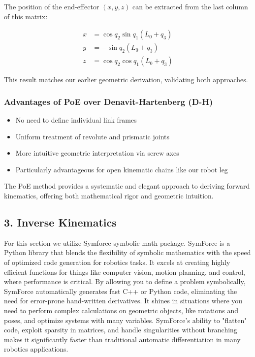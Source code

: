\begin{solution}
The position of the end-effector $(x, y, z)$ can be extracted from the last column of this matrix:

\begin{align*}
    x &= \cos q_2 \sin q_1 (L_0 + q_3) \\
    y &= -\sin q_2 (L_0 + q_3) \\
    z &= \cos q_2 \cos q_1 (L_0 + q_3)
\end{align*}

This result matches our earlier geometric derivation, validating both approaches.

\subsubsection*{Advantages of PoE over Denavit-Hartenberg (D-H)}
\begin{itemize}
    \item No need to define individual link frames
    \item Uniform treatment of revolute and prismatic joints
    \item More intuitive geometric interpretation via screw axes
    \item Particularly advantageous for open kinematic chains like our robot leg
\end{itemize}

The PoE method provides a systematic and elegant approach to deriving forward kinematics, offering both mathematical rigor and geometric intuition.
	
\subsection*{3. Inverse Kinematics}
For this section we utilize Symforce \cite{martiros2022symforce} symbolic math package. SymForce is a Python library that blends the flexibility of symbolic mathematics with the speed of optimized code generation for robotics tasks. It excels at creating highly efficient functions for things like computer vision, motion planning, and control, where performance is critical. By allowing you to define a problem symbolically, SymForce automatically generates fast C++ or Python code, eliminating the need for error-prone hand-written derivatives. It shines in situations where you need to perform complex calculations on geometric objects, like rotations and poses, and optimize systems with many variables. SymForce's ability to "flatten" code, exploit sparsity in matrices, and handle singularities without branching makes it significantly faster than traditional automatic differentiation in many robotics applications.


\end{solution}

